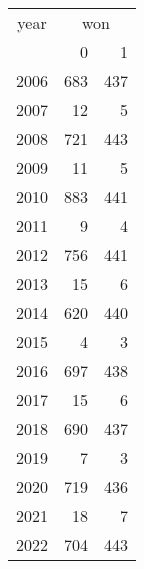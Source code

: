 \footnotesize\begin{tabular}[t]{lrr}
\toprule
\multicolumn{1}{c}{year} & \multicolumn{2}{c}{won} \\
\cmidrule(l{3pt}r{3pt}){1-1} \cmidrule(l{3pt}r{3pt}){2-3}
  & 0 & 1\\
\midrule
2006 & 683 & 437\\
2007 & 12 & 5\\
2008 & 721 & 443\\
2009 & 11 & 5\\
2010 & 883 & 441\\
2011 & 9 & 4\\
2012 & 756 & 441\\
2013 & 15 & 6\\
2014 & 620 & 440\\
2015 & 4 & 3\\
2016 & 697 & 438\\
2017 & 15 & 6\\
2018 & 690 & 437\\
2019 & 7 & 3\\
2020 & 719 & 436\\
2021 & 18 & 7\\
2022 & 704 & 443\\
\bottomrule
\end{tabular}
